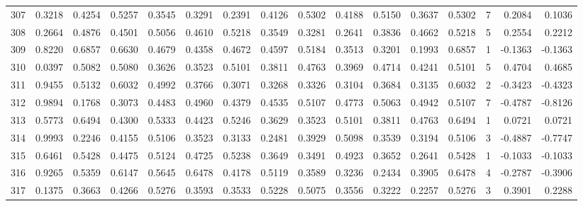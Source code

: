 \begin{tabular}{lrrrrrrrrrrrrrrr}
307 &      0.3218 &  0.4254 &  0.5257 &  0.3545 &  0.3291 &  0.2391 &  0.4126 &  0.5302 &  0.4188 &  0.5150 &   0.3637 &     0.5302 &      7 &                    0.2084 &                     0.1036 \\
308 &      0.2664 &  0.4876 &  0.4501 &  0.5056 &  0.4610 &  0.5218 &  0.3549 &  0.3281 &  0.2641 &  0.3836 &   0.4662 &     0.5218 &      5 &                    0.2554 &                     0.2212 \\
309 &      0.8220 &  0.6857 &  0.6630 &  0.4679 &  0.4358 &  0.4672 &  0.4597 &  0.5184 &  0.3513 &  0.3201 &   0.1993 &     0.6857 &      1 &                   -0.1363 &                    -0.1363 \\
310 &      0.0397 &  0.5082 &  0.5080 &  0.3626 &  0.3523 &  0.5101 &  0.3811 &  0.4763 &  0.3969 &  0.4714 &   0.4241 &     0.5101 &      5 &                    0.4704 &                     0.4685 \\
311 &      0.9455 &  0.5132 &  0.6032 &  0.4992 &  0.3766 &  0.3071 &  0.3268 &  0.3326 &  0.3104 &  0.3684 &   0.3135 &     0.6032 &      2 &                   -0.3423 &                    -0.4323 \\
312 &      0.9894 &  0.1768 &  0.3073 &  0.4483 &  0.4960 &  0.4379 &  0.4535 &  0.5107 &  0.4773 &  0.5063 &   0.4942 &     0.5107 &      7 &                   -0.4787 &                    -0.8126 \\
313 &      0.5773 &  0.6494 &  0.4300 &  0.5333 &  0.4423 &  0.5246 &  0.3629 &  0.3523 &  0.5101 &  0.3811 &   0.4763 &     0.6494 &      1 &                    0.0721 &                     0.0721 \\
314 &      0.9993 &  0.2246 &  0.4155 &  0.5106 &  0.3523 &  0.3133 &  0.2481 &  0.3929 &  0.5098 &  0.3539 &   0.3194 &     0.5106 &      3 &                   -0.4887 &                    -0.7747 \\
315 &      0.6461 &  0.5428 &  0.4475 &  0.5124 &  0.4725 &  0.5238 &  0.3649 &  0.3491 &  0.4923 &  0.3652 &   0.2641 &     0.5428 &      1 &                   -0.1033 &                    -0.1033 \\
316 &      0.9265 &  0.5359 &  0.6147 &  0.5645 &  0.6478 &  0.4178 &  0.5119 &  0.3589 &  0.3236 &  0.2434 &   0.3905 &     0.6478 &      4 &                   -0.2787 &                    -0.3906 \\
317 &      0.1375 &  0.3663 &  0.4266 &  0.5276 &  0.3593 &  0.3533 &  0.5228 &  0.5075 &  0.3556 &  0.3222 &   0.2257 &     0.5276 &      3 &                    0.3901 &                     0.2288 \\

\end{tabular}
